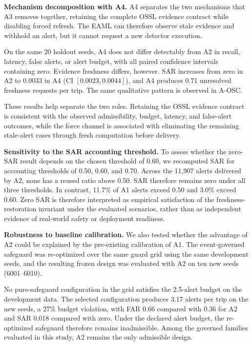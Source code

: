 \documentclass[conference]{IEEEtran}
\begin{document}
\textbf{Mechanism decomposition with A4.}
A4 separates the two mechanisms that A3 removes together, retaining
the complete OSSL evidence contract while disabling forced refresh.
The EAML can therefore
observe stale evidence and withhold an alert, but it cannot request a new
detector execution.

On the same 20 holdout seeds, A4 does not differ detectably from A2 in
recall, latency, false alerts, or alert budget, with all paired confidence
intervals containing zero. Evidence freshness differs, however. SAR
increases from zero in A2 to 0.0033 in A4
(CI $[0.0023,0.0044]$), and A4 produces 0.71 unresolved freshness
requests per trip. The same qualitative pattern is observed in A-OSC.

These results help separate the two roles. Retaining the OSSL evidence
contract is consistent with the observed admissibility, budget, latency,
and false-alert outcomes, while the force channel is associated with
eliminating the remaining stale-alert cases through fresh computation
before delivery.

\textbf{Sensitivity to the SAR accounting threshold.}
To assess whether the zero-SAR result depends on the chosen threshold of
0.60, we recomputed SAR for accounting thresholds of 0.50, 0.60, and
0.70. Across the 11{,}907 alerts delivered by A2, none has a reused ratio
above 0.50. SAR therefore remains zero under all three thresholds. In
contrast, 11.7\% of A1 alerts exceed 0.50 and 3.0\% exceed 0.60. Zero
SAR is therefore interpreted as empirical satisfaction of the
freshness-restoration invariant under the evaluated scenarios, rather
than as independent evidence of real-world safety or deployment
readiness.

\textbf{Robustness to baseline calibration.}
We also tested whether the advantage of A2 could be explained by the
pre-existing calibration of A1. The event-governed safeguard was
re-optimized over the same guard grid using the same development seeds,
and the resulting frozen design was evaluated with A2 on ten new seeds
(6001--6010).

No pure-safeguard configuration in the grid satisfies the 2.5-alert
budget on the development data. The selected configuration produces
3.17 alerts per trip on the new seeds, a 27\% budget violation, with FAR
0.66 compared with 0.36 for A2 and SAR 0.018 compared with zero.
Under the declared alert budget, the re-optimized safeguard therefore
remains inadmissible. Among the governed families evaluated in this
study, A2 remains the only admissible design.
\end{document}
